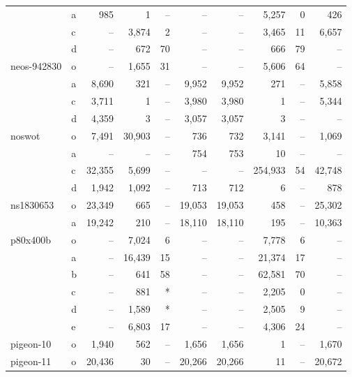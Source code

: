 \documentclass[11.5pt]{article}
\begin{document}
\begin{table}[H]
\begin{tabular}{l|l|rrr|rrrr|r}
                  & a & 985   & 1     & -- & --     & --    & 5,257 & 0    & 426\\
                  & c & --    & 3,874 & 2  & --     & --    & 3,465 & 11   & 6,657\\
                  & d & --    & 672   & 70 & --     & --    & 666   & 79   & --\\
neos-942830       & o & --    & 1,655 & 31 & --     & --    & 5,606 & 64   & --\\
                  & a & 8,690 & 321   & -- & 9,952  & 9,952 & 271   & --   & 5,858\\
                  & c & 3,711 & 1     & -- & 3,980  & 3,980 & 1     & --   & 5,344\\
                  & d & 4,359 & 3     & -- & 3,057  & 3,057 & 3     & --   & --\\
noswot            & o & 7,491 & 30,903& -- & 736    & 732   & 3,141 & --   & 1,069\\ 
                  & a & --    & --    & -- & 754    & 753   & 10    & --   & --\\
                  & c & 32,355& 5,699 & -- & --     & --    &254,933& 54   & 42,748\\
                  & d & 1,942 & 1,092 & -- & 713    & 712   & 6     & --   & 878\\
ns1830653         & o & 23,349& 665   & -- & 19,053 & 19,053& 458   & --   & 25,302\\
                  & a & 19,242& 210   & -- & 18,110 & 18,110& 195   & --   & 10,363\\
p80x400b          & o & --    & 7,024 & 6  & --     & --    & 7,778 & 6    & -- \\
                  & a & --    & 16,439& 15 & --     & --    & 21,374& 17   & -- \\
                  & b & --    & 641   & 58 & --     & --    & 62,581& 70   & -- \\
                  & c & --    & 881   & *  & --     & --    & 2,205 & 0    & -- \\
                  & d & --    & 1,589 & *  & --     & --    & 2,505 & 9    & -- \\
                  & e & --    & 6,803 & 17 & --     & --    & 4,306 & 24   & -- \\
pigeon-10         & o & 1,940 & 562   & -- & 1,656  & 1,656 & 1     & --   & 1,670 \\
pigeon-11         & o & 20,436& 30    & -- & 20,266 & 20,266& 11    & --   & 20,672 \\

\end{tabular}
\end{table}
\end{document}
